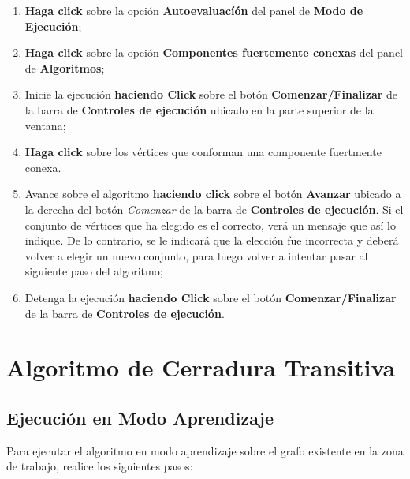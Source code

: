 \documentclass{book}
\begin{document}
\begin{enumerate}
	\itemsep=8pt \topsep=0pt \partopsep=0pt \parskip=0pt \parsep=0pt

	\item \textbf{Haga click} sobre la opción \textbf{Autoevaluacíón} del panel de \textbf{Modo de Ejecución};

	\item \textbf{Haga click} sobre la opción \textbf{Componentes fuertemente conexas} del panel de \textbf{Algoritmos};

	\item Inicie la ejecución \textbf{haciendo Click} sobre el botón \textbf{Comenzar/Finalizar} de la barra de \textbf{Controles de ejecución} ubicado en la parte superior de la ventana;

	\item \textbf{Haga click} sobre los vértices que conforman una componente fuertmente conexa.

	\item Avance sobre el algoritmo \textbf{haciendo click} sobre el botón \textbf{Avanzar} ubicado a la derecha del botón \textit{Comenzar} de la barra de \textbf{Controles de ejecución}. Si el conjunto de vértices que ha elegido es el correcto, verá un mensaje que así lo indique. De lo contrario, se le indicará que la elección fue incorrecta y deberá volver a elegir un nuevo conjunto, para luego volver a intentar pasar al siguiente paso del algoritmo;

	\item Detenga la ejecución \textbf{haciendo Click} sobre el botón \textbf{Comenzar/Finalizar} de la barra de \textbf{Controles de ejecución}.

\end{enumerate}
\medskip





%
%
\chapter{Algoritmo de Cerradura Transitiva}


\section{Ejecución en Modo Aprendizaje}

Para ejecutar el algoritmo en modo aprendizaje sobre el grafo existente en la zona de trabajo, realice los siguientes pasos:
\medskip
\end{document}
